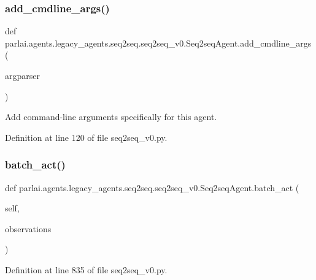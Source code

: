 \subsubsection{\texorpdfstring{add\+\_\+cmdline\+\_\+args()}{add\_cmdline\_args()}}
{\footnotesize\ttfamily def parlai.\+agents.\+legacy\+\_\+agents.\+seq2seq.\+seq2seq\+\_\+v0.\+Seq2seq\+Agent.\+add\+\_\+cmdline\+\_\+args (\begin{DoxyParamCaption}\item[{}]{argparser }\end{DoxyParamCaption})\hspace{0.3cm}{\ttfamily [static]}}

\begin{DoxyVerb}Add command-line arguments specifically for this agent.\end{DoxyVerb}
 

Definition at line 120 of file seq2seq\+\_\+v0.\+py.

\mbox{\label{classparlai_1_1agents_1_1legacy__agents_1_1seq2seq_1_1seq2seq__v0_1_1Seq2seqAgent_a4ae534e440fd57603bc9b6e7c08b1c57}} 
\subsubsection{\texorpdfstring{batch\+\_\+act()}{batch\_act()}}
{\footnotesize\ttfamily def parlai.\+agents.\+legacy\+\_\+agents.\+seq2seq.\+seq2seq\+\_\+v0.\+Seq2seq\+Agent.\+batch\+\_\+act (\begin{DoxyParamCaption}\item[{}]{self,  }\item[{}]{observations }\end{DoxyParamCaption})}



Definition at line 835 of file seq2seq\+\_\+v0.\+py.



